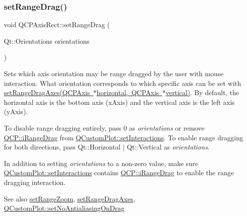 \subsubsection{\texorpdfstring{set\+Range\+Drag()}{setRangeDrag()}}
{\footnotesize\ttfamily void Q\+C\+P\+Axis\+Rect\+::set\+Range\+Drag (\begin{DoxyParamCaption}\item[{Qt\+::\+Orientations}]{orientations }\end{DoxyParamCaption})}

Sets which axis orientation may be range dragged by the user with mouse interaction. What orientation corresponds to which specific axis can be set with \mbox{\hyperlink{class_q_c_p_axis_rect_a648cce336bd99daac4a5ca3e5743775d}{set\+Range\+Drag\+Axes(\+Q\+C\+P\+Axis $\ast$horizontal, Q\+C\+P\+Axis $\ast$vertical)}}. By default, the horizontal axis is the bottom axis (x\+Axis) and the vertical axis is the left axis (y\+Axis).

To disable range dragging entirely, pass 0 as {\itshape orientations} or remove \mbox{\hyperlink{namespace_q_c_p_a2ad6bb6281c7c2d593d4277b44c2b037a2c4432b9aceafb94000be8d1b589ef18}{Q\+C\+P\+::i\+Range\+Drag}} from \mbox{\hyperlink{class_q_custom_plot_a5ee1e2f6ae27419deca53e75907c27e5}{Q\+Custom\+Plot\+::set\+Interactions}}. To enable range dragging for both directions, pass {\ttfamily Qt\+::\+Horizontal $\vert$ Qt\+::\+Vertical} as {\itshape orientations}.

In addition to setting {\itshape orientations} to a non-\/zero value, make sure \mbox{\hyperlink{class_q_custom_plot_a5ee1e2f6ae27419deca53e75907c27e5}{Q\+Custom\+Plot\+::set\+Interactions}} contains \mbox{\hyperlink{namespace_q_c_p_a2ad6bb6281c7c2d593d4277b44c2b037a2c4432b9aceafb94000be8d1b589ef18}{Q\+C\+P\+::i\+Range\+Drag}} to enable the range dragging interaction.

\begin{DoxySeeAlso}{See also}
\mbox{\hyperlink{class_q_c_p_axis_rect_a7960a9d222f1c31d558b064b60f86a31}{set\+Range\+Zoom}}, \mbox{\hyperlink{class_q_c_p_axis_rect_a648cce336bd99daac4a5ca3e5743775d}{set\+Range\+Drag\+Axes}}, \mbox{\hyperlink{class_q_custom_plot_a775bdcb6329d44701aeaa6135b0e5265}{Q\+Custom\+Plot\+::set\+No\+Antialiasing\+On\+Drag}} 
\end{DoxySeeAlso}
\mbox{\label{class_q_c_p_axis_rect_a648cce336bd99daac4a5ca3e5743775d}} 
